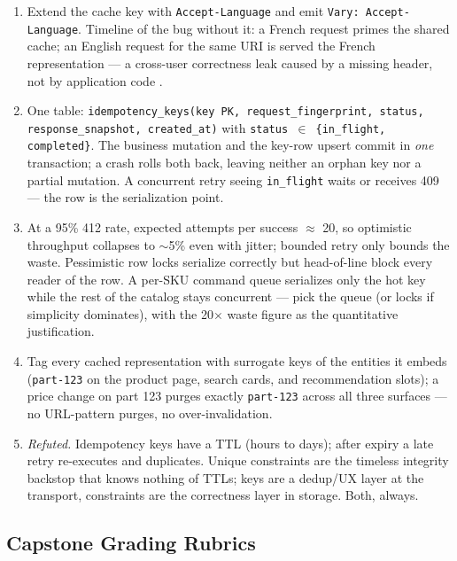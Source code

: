 \begin{enumerate}[leftmargin=2.2em]
    persists and replays the first result including client errors
    (validation is deterministic) but does not replay transient 5xx ---
    matching Listing 10.1's abandonment of the key row on downstream 5xx.
  \item Extend the cache key with \texttt{Accept-Language} and emit
    \texttt{Vary: Accept-Language}. Timeline of the bug without it: a
    French request primes the shared cache; an English request for the same
    URI is served the French representation --- a cross-user correctness
    leak caused by a missing header, not by application code
    \cite{rfc9110}.
  \item One table: \texttt{idempotency\_keys(key PK, request\_fingerprint,
    status, response\_snapshot, created\_at)} with
    \texttt{status $\in$ \{in\_flight, completed\}}. The business mutation
    and the key-row upsert commit in \emph{one} transaction; a crash rolls
    both back, leaving neither an orphan key nor a partial mutation. A
    concurrent retry seeing \texttt{in\_flight} waits or receives 409 ---
    the row is the serialization point.
  \item At a 95\% 412 rate, expected attempts per success $\approx$ 20, so
    optimistic throughput collapses to $\sim$5\% even with jitter; bounded
    retry only bounds the waste. Pessimistic row locks serialize correctly
    but head-of-line block every reader of the row. A per-SKU command queue
    serializes only the hot key while the rest of the catalog stays
    concurrent --- pick the queue (or locks if simplicity dominates), with
    the 20$\times$ waste figure as the quantitative justification.
  \item Tag every cached representation with surrogate keys of the entities
    it embeds (\texttt{part-123} on the product page, search cards, and
    recommendation slots); a price change on part 123 purges exactly
    \texttt{part-123} across all three surfaces --- no URL-pattern purges,
    no over-invalidation.
  \item \emph{Refuted.} Idempotency keys have a TTL (hours to days); after
    expiry a late retry re-executes and duplicates. Unique constraints are
    the timeless integrity backstop that knows nothing of TTLs; keys are a
    dedup/UX layer at the transport, constraints are the correctness layer
    in storage. Both, always.
\end{enumerate}

\subsection{Capstone Grading Rubrics}

